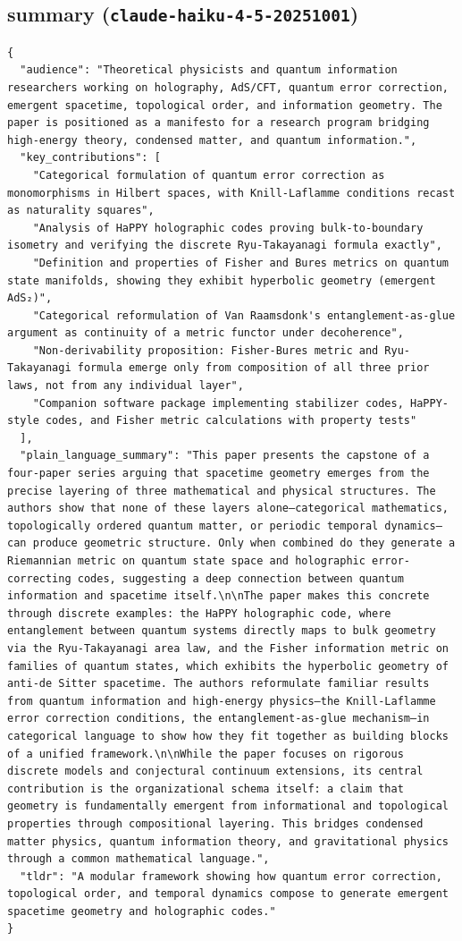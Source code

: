 \documentclass[11pt]{article}
\begin{document}
\subsection*{summary (\texttt{claude-haiku-4-5-20251001})}
\begin{verbatim}
{
  "audience": "Theoretical physicists and quantum information researchers working on holography, AdS/CFT, quantum error correction, emergent spacetime, topological order, and information geometry. The paper is positioned as a manifesto for a research program bridging high-energy theory, condensed matter, and quantum information.",
  "key_contributions": [
    "Categorical formulation of quantum error correction as monomorphisms in Hilbert spaces, with Knill-Laflamme conditions recast as naturality squares",
    "Analysis of HaPPY holographic codes proving bulk-to-boundary isometry and verifying the discrete Ryu-Takayanagi formula exactly",
    "Definition and properties of Fisher and Bures metrics on quantum state manifolds, showing they exhibit hyperbolic geometry (emergent AdS₂)",
    "Categorical reformulation of Van Raamsdonk's entanglement-as-glue argument as continuity of a metric functor under decoherence",
    "Non-derivability proposition: Fisher-Bures metric and Ryu-Takayanagi formula emerge only from composition of all three prior laws, not from any individual layer",
    "Companion software package implementing stabilizer codes, HaPPY-style codes, and Fisher metric calculations with property tests"
  ],
  "plain_language_summary": "This paper presents the capstone of a four-paper series arguing that spacetime geometry emerges from the precise layering of three mathematical and physical structures. The authors show that none of these layers alone—categorical mathematics, topologically ordered quantum matter, or periodic temporal dynamics—can produce geometric structure. Only when combined do they generate a Riemannian metric on quantum state space and holographic error-correcting codes, suggesting a deep connection between quantum information and spacetime itself.\n\nThe paper makes this concrete through discrete examples: the HaPPY holographic code, where entanglement between quantum systems directly maps to bulk geometry via the Ryu-Takayanagi area law, and the Fisher information metric on families of quantum states, which exhibits the hyperbolic geometry of anti-de Sitter spacetime. The authors reformulate familiar results from quantum information and high-energy physics—the Knill-Laflamme error correction conditions, the entanglement-as-glue mechanism—in categorical language to show how they fit together as building blocks of a unified framework.\n\nWhile the paper focuses on rigorous discrete models and conjectural continuum extensions, its central contribution is the organizational schema itself: a claim that geometry is fundamentally emergent from informational and topological properties through compositional layering. This bridges condensed matter physics, quantum information theory, and gravitational physics through a common mathematical language.",
  "tldr": "A modular framework showing how quantum error correction, topological order, and temporal dynamics compose to generate emergent spacetime geometry and holographic codes."
}
\end{verbatim}
\end{document}
